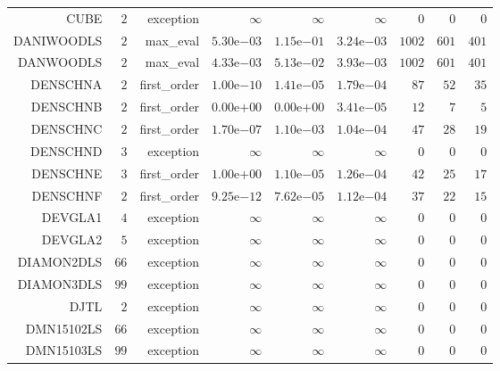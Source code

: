 \begin{longtable}{rrrrrrrrr}
CUBE & \(     2\) & exception & \(\infty\) & \(\infty\) & \(\infty\) & \(     0\) & \(     0\) & \(     0\) \\
DANIWOODLS & \(     2\) & max\_eval & \( 5.30\)e\(-03\) & \( 1.15\)e\(-01\) & \( 3.24\)e\(-03\) & \(  1002\) & \(   601\) & \(   401\) \\
DANWOODLS & \(     2\) & max\_eval & \( 4.33\)e\(-03\) & \( 5.13\)e\(-02\) & \( 3.93\)e\(-03\) & \(  1002\) & \(   601\) & \(   401\) \\
DENSCHNA & \(     2\) & first\_order & \( 1.00\)e\(-10\) & \( 1.41\)e\(-05\) & \( 1.79\)e\(-04\) & \(    87\) & \(    52\) & \(    35\) \\
DENSCHNB & \(     2\) & first\_order & \( 0.00\)e\(+00\) & \( 0.00\)e\(+00\) & \( 3.41\)e\(-05\) & \(    12\) & \(     7\) & \(     5\) \\
DENSCHNC & \(     2\) & first\_order & \( 1.70\)e\(-07\) & \( 1.10\)e\(-03\) & \( 1.04\)e\(-04\) & \(    47\) & \(    28\) & \(    19\) \\
DENSCHND & \(     3\) & exception & \(\infty\) & \(\infty\) & \(\infty\) & \(     0\) & \(     0\) & \(     0\) \\
DENSCHNE & \(     3\) & first\_order & \( 1.00\)e\(+00\) & \( 1.10\)e\(-05\) & \( 1.26\)e\(-04\) & \(    42\) & \(    25\) & \(    17\) \\
DENSCHNF & \(     2\) & first\_order & \( 9.25\)e\(-12\) & \( 7.62\)e\(-05\) & \( 1.12\)e\(-04\) & \(    37\) & \(    22\) & \(    15\) \\
DEVGLA1 & \(     4\) & exception & \(\infty\) & \(\infty\) & \(\infty\) & \(     0\) & \(     0\) & \(     0\) \\
DEVGLA2 & \(     5\) & exception & \(\infty\) & \(\infty\) & \(\infty\) & \(     0\) & \(     0\) & \(     0\) \\
DIAMON2DLS & \(    66\) & exception & \(\infty\) & \(\infty\) & \(\infty\) & \(     0\) & \(     0\) & \(     0\) \\
DIAMON3DLS & \(    99\) & exception & \(\infty\) & \(\infty\) & \(\infty\) & \(     0\) & \(     0\) & \(     0\) \\
DJTL & \(     2\) & exception & \(\infty\) & \(\infty\) & \(\infty\) & \(     0\) & \(     0\) & \(     0\) \\
DMN15102LS & \(    66\) & exception & \(\infty\) & \(\infty\) & \(\infty\) & \(     0\) & \(     0\) & \(     0\) \\
DMN15103LS & \(    99\) & exception & \(\infty\) & \(\infty\) & \(\infty\) & \(     0\) & \(     0\) & \(     0\) \\

\end{longtable}
